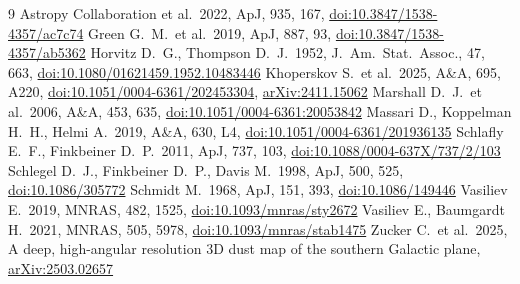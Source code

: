 \documentclass[11pt,a4paper]{article}
\begin{document}
\begin{thebibliography}{9}
 Astropy Collaboration et al.\ 2022, ApJ, 935, 167,
\href{https://doi.org/10.3847/1538-4357/ac7c74}{doi:10.3847/1538-4357/ac7c74}
 Green G.~M.\ et al.\ 2019, ApJ, 887, 93,
\href{https://doi.org/10.3847/1538-4357/ab5362}{doi:10.3847/1538-4357/ab5362}
 Horvitz D.~G., Thompson D.~J.\ 1952, J.\ Am.\ Stat.\ Assoc., 47, 663,
\href{https://doi.org/10.1080/01621459.1952.10483446}{doi:10.1080/01621459.1952.10483446}
 Khoperskov S.\ et al.\ 2025, A\&A, 695, A220,
\href{https://doi.org/10.1051/0004-6361/202453304}{doi:10.1051/0004-6361/202453304},
\href{https://arxiv.org/abs/2411.15062}{arXiv:2411.15062}
 Marshall D.~J.\ et al.\ 2006, A\&A, 453, 635,
\href{https://doi.org/10.1051/0004-6361:20053842}{doi:10.1051/0004-6361:20053842}
 Massari D., Koppelman H.~H., Helmi A.\ 2019, A\&A, 630, L4,
\href{https://doi.org/10.1051/0004-6361/201936135}{doi:10.1051/0004-6361/201936135}
 Schlafly E.~F., Finkbeiner D.~P.\ 2011, ApJ, 737, 103,
\href{https://doi.org/10.1088/0004-637X/737/2/103}{doi:10.1088/0004-637X/737/2/103}
 Schlegel D.~J., Finkbeiner D.~P., Davis M.\ 1998, ApJ, 500, 525,
\href{https://doi.org/10.1086/305772}{doi:10.1086/305772}
 Schmidt M.\ 1968, ApJ, 151, 393,
\href{https://doi.org/10.1086/149446}{doi:10.1086/149446}
 Vasiliev E.\ 2019, MNRAS, 482, 1525,
\href{https://doi.org/10.1093/mnras/sty2672}{doi:10.1093/mnras/sty2672}
 Vasiliev E., Baumgardt H.\ 2021, MNRAS, 505, 5978,
\href{https://doi.org/10.1093/mnras/stab1475}{doi:10.1093/mnras/stab1475}
 Zucker C.\ et al.\ 2025, A deep, high-angular resolution 3D dust map of the southern
Galactic plane, \href{https://arxiv.org/abs/2503.02657}{arXiv:2503.02657}
\end{thebibliography}
\end{document}

